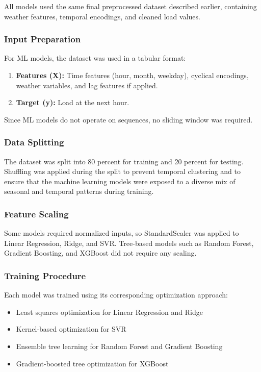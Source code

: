\documentclass[oneside, 12pt]{book}
\numberwithin{equation}{chapter}
\begin{document}
All models used the same final preprocessed dataset described earlier, containing weather features, temporal encodings, and cleaned load values.

\subsubsection{Input Preparation}

For ML models, the dataset was used in a tabular format:
\begin{enumerate}
    \item \textbf{Features (X):} Time features (hour, month, weekday), cyclical encodings, weather variables, and lag features if applied.
    \item \textbf{Target (y):} Load at the next hour.
\end{enumerate}

Since ML models do not operate on sequences, no sliding window was required.

\subsubsection{Data Splitting}

The dataset was split into 80 percent for training and 20 percent for testing. Shuffling was applied during the split to prevent temporal clustering and to ensure that the machine learning models were exposed to a diverse mix of seasonal and temporal patterns during training.

\subsubsection{Feature Scaling}

Some models required normalized inputs, so StandardScaler was applied to Linear Regression, Ridge, and SVR. Tree-based models such as Random Forest, Gradient Boosting, and XGBoost did not require any scaling.

\subsubsection{Training Procedure}

Each model was trained using its corresponding optimization approach:
\begin{itemize}
    \item Least squares optimization for Linear Regression and Ridge
    \item Kernel-based optimization for SVR
    \item Ensemble tree learning for Random Forest and Gradient Boosting
    \item Gradient-boosted tree optimization for XGBoost
\end{itemize}
\end{document}
